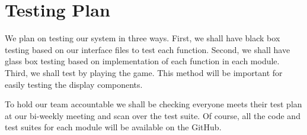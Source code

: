 \section{Testing Plan}
We plan on testing our system in three ways. First, we shall have black box testing based on our interface files to test each function. Second, we shall have glass box testing based on implementation of each function in each module. Third, we shall test by playing the game. This method will be important for easily testing the display components. 

To hold our team accountable we shall be checking everyone meets their test plan at our bi-weekly meeting and scan over the test suite. Of course, all the code and test suites for each module will be available on the GitHub. 



